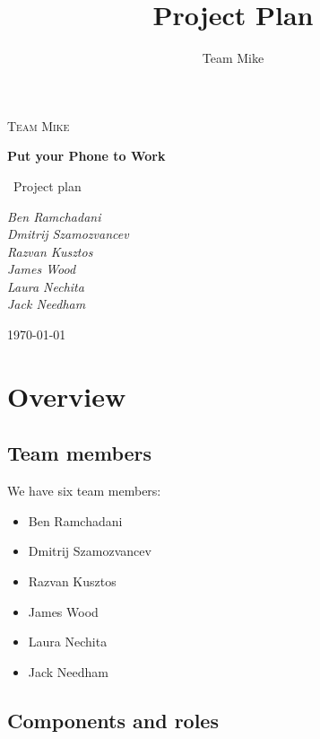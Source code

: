 \documentclass[
  twoside,
  10pt, a4paper
]{article}
\title{Project Plan}
\author{Team Mike}
\begin{document}
\begin{titlepage}
	\centering
	
	{\scshape\Large Team Mike\par}
	\vspace{4cm}
	{\huge\bfseries Put your Phone to Work\par}
	\vspace{1.5cm}
	{\Large\
	Project plan
	\par}
	\vspace{2cm}
	{\Large\itshape 
	      Ben Ramchadani\\
	      Dmitrij Szamozvancev\\
	      Razvan Kusztos\\
	      James Wood \\
	      Laura Nechita \\
	      Jack Needham
	      \par}
	\vfill

	{\large \today\par}
\end{titlepage}
\maketitle
\tableofcontents
\newpage

\section{Overview}

\subsection{Team members}

We have six team members:
\begin{itemize}
\item Ben Ramchadani
\item Dmitrij Szamozvancev
\item Razvan Kusztos
\item James Wood
\item Laura Nechita
\item Jack Needham
\end{itemize}



\subsection{Components and roles}
\end{document}
